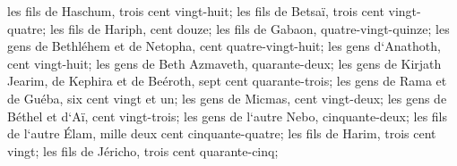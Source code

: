 \verse les fils de Haschum, trois cent vingt-huit; 
\verse les fils de Betsaï, trois cent vingt-quatre; 
\verse les fils de Hariph, cent douze; 
\verse les fils de Gabaon, quatre-vingt-quinze; 
\verse les gens de Bethléhem et de Netopha, cent quatre-vingt-huit; 
\verse les gens d`Anathoth, cent vingt-huit; 
\verse les gens de Beth Azmaveth, quarante-deux; 
\verse les gens de Kirjath Jearim, de Kephira et de Beéroth, sept cent quarante-trois; 
\verse les gens de Rama et de Guéba, six cent vingt et un; 
\verse les gens de Micmas, cent vingt-deux; 
\verse les gens de Béthel et d`Aï, cent vingt-trois; 
\verse les gens de l`autre Nebo, cinquante-deux; 
\verse les fils de l`autre Élam, mille deux cent cinquante-quatre; 
\verse les fils de Harim, trois cent vingt; 
\verse les fils de Jéricho, trois cent quarante-cinq; 
